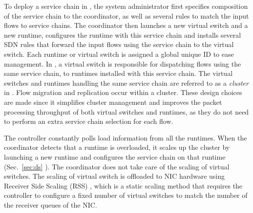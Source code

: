 To deploy a service chain in \nfactor, the system administrator first specifies composition of the service chain to the coordinator, as well as several rules to match the input flows to service chains. %
The coordinator then launches a new virtual switch and a new runtime, configures the runtime with this service chain and installs several SDN rules that forward the input flows using the service chain to the virtual switch. %
Each runtime or virtual switch is assigned a global unique ID to ease management.  In \nfactor, a virtual switch is responsible for dispatching flows using the same service chain, to runtimes installed with this service chain. The virtual switches and runtimes handling the same service chain are referred to as a {\em cluster} in \nfactor. Flow migration and replication occur within a cluster. These design choices are made since it simplifies cluster management and improves the packet processing throughput of both virtual switches and runtimes, as they do not need to perform an extra service chain selection for each flow.


The controller constantly polls load information from all the runtimes. When the coordinator detects that a runtime is overloaded, it scales up the cluster by launching a new runtime and configures the service chain on that runtime (Sec.~\ref{sec:ds}%
). The coordinator does not take care of the scaling of virtual switches. The scaling of virtual switch is offloaded to NIC hardware using Receiver Side Scaling (RSS) \cite{rss, jeong2014mtcp}, which is a static scaling method that requires the controller to configure a fixed number of virtual switches to match the number of the receiver queues of the NIC.  %


